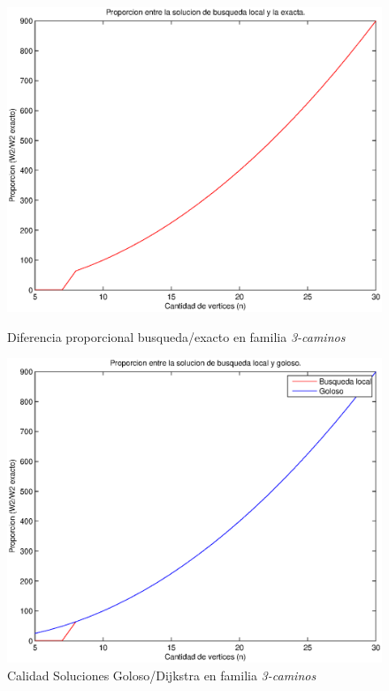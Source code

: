 \begin{figure}[H]
  \begin{minipage}{0.5\linewidth}
    \includegraphics[width=\linewidth]{graficos/busq_local_proporcion.eps}
    \caption{Diferencia proporcional busqueda/exacto en familia \emph{3-caminos}}\label{fig:busq-local-proporcion}
  \end{minipage}
  \hfill
  \begin{minipage}{0.5\linewidth}
    \includegraphics[width=\linewidth]{graficos/busq_local_proporcion_comparacion.eps}
    \caption{Calidad Soluciones Goloso/Dijkstra en familia \emph{3-caminos}}\label{fig:busq-local-proporcion-comparacion}
  \end{minipage}
\end{figure}

